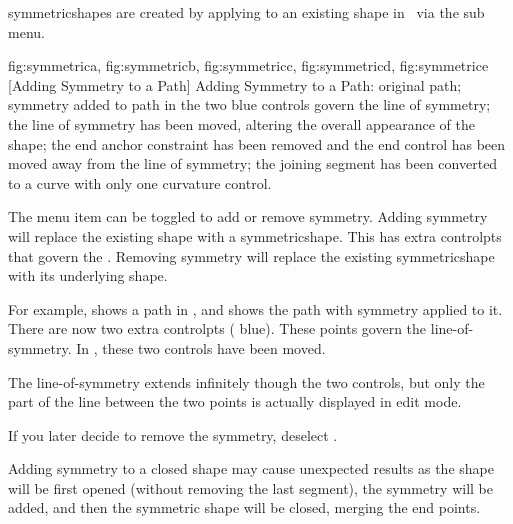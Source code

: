 \Glspl{symmetricshape} are created by applying
 to an existing \gls{shape} in 
\editpathmode\ via the  sub menu.

{
  {fig:symmetrica}{}{},
  {fig:symmetricb}{}{},
  {fig:symmetricc}{}{},
  {fig:symmetricd}{}{},
  {fig:symmetrice}{}{}
}
[Adding Symmetry to a Path]
{Adding Symmetry to a Path:  original path;
 symmetry added to path in  the
two blue controls govern the line of symmetry;
 the line of symmetry has been moved, altering the
overall appearance of the shape;  the end anchor
constraint has been removed and the end control has been moved
away from the line of symmetry;  the joining segment
has been converted to a curve with only one curvature control.}


The  menu item can be toggled
to add or remove \gls{symmetry}. Adding symmetry will replace the existing
\gls{shape} with a \gls{symmetricshape}. This has extra
\glspl{controlpt} that govern the .
Removing \gls{symmetry} will replace the existing \gls{symmetricshape}
with its underlying \gls{shape}.

For example,  shows a \gls*{path}
in \editpathmode, and  shows the
path with \gls{symmetry} applied to it. There are now two extra
\glspl{controlpt} ( blue). These points govern the 
\gls{line-of-symmetry}. In , these two controls
have been moved.

\begin{information}
The \gls{line-of-symmetry} extends infinitely though the two controls,
but only the part of the line between the two points is actually
displayed in edit mode.
\end{information}

If you later decide to remove the symmetry, deselect
.

\begin{warning}
Adding \gls{symmetry} to a closed shape may cause unexpected
results as the shape will be first opened (without removing the
last segment), the \gls{symmetry} will be added, and then the symmetric
shape will be closed, merging the end points.
\end{warning}

